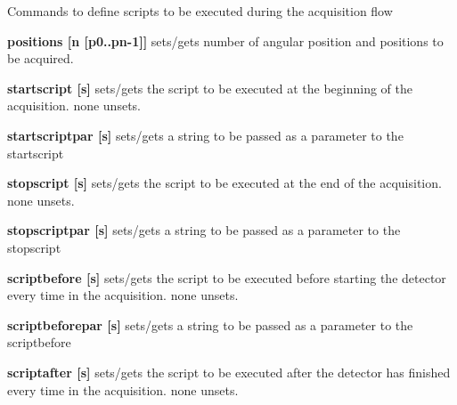 Commands to define scripts to be executed during the acquisition flow


\begin{DoxyItemize}
\item {\bfseries positions \mbox{[}n \mbox{[}p0..pn-\/1\mbox{]}\mbox{]}} sets/gets number of angular position and positions to be acquired.
\end{DoxyItemize}


\begin{DoxyItemize}
\item {\bfseries startscript \mbox{[}s\mbox{]}} sets/gets the script to be executed at the beginning of the acquisition. {\ttfamily none} unsets.
\end{DoxyItemize}


\begin{DoxyItemize}
\item {\bfseries startscriptpar \mbox{[}s\mbox{]}} sets/gets a string to be passed as a parameter to the startscript
\end{DoxyItemize}


\begin{DoxyItemize}
\item {\bfseries stopscript \mbox{[}s\mbox{]}} sets/gets the script to be executed at the end of the acquisition. {\ttfamily none} unsets.
\end{DoxyItemize}


\begin{DoxyItemize}
\item {\bfseries stopscriptpar \mbox{[}s\mbox{]}} sets/gets a string to be passed as a parameter to the stopscript
\end{DoxyItemize}


\begin{DoxyItemize}
\item {\bfseries scriptbefore \mbox{[}s\mbox{]}} sets/gets the script to be executed before starting the detector every time in the acquisition. {\ttfamily none} unsets.
\end{DoxyItemize}


\begin{DoxyItemize}
\item {\bfseries scriptbeforepar \mbox{[}s\mbox{]}} sets/gets a string to be passed as a parameter to the scriptbefore
\end{DoxyItemize}


\begin{DoxyItemize}
\item {\bfseries scriptafter \mbox{[}s\mbox{]}} sets/gets the script to be executed after the detector has finished every time in the acquisition. {\ttfamily none} unsets.
\end{DoxyItemize}


